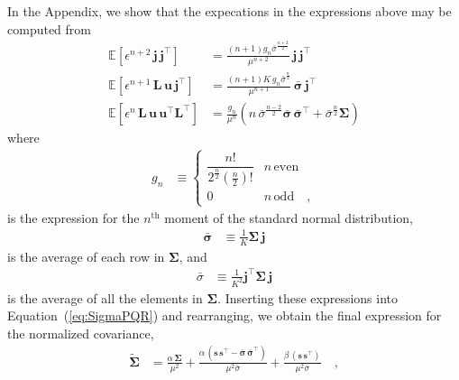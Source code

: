 \documentclass[modern]{aastex62}
\begin{document}
%
In the Appendix, we show that the expecations in the expressions above may be computed from
%
\begin{align}
    \mathbb{E}\left[
        \epsilon^{n + 2} \, \mathbf{j} \, \mathbf{j}^\top
        \right]
     & =
    \frac{(n + 1) g_{n} \bar{\sigma}^\frac{n+2}{2}}{\mu^{n+2}} \, \mathbf{j} \, \mathbf{j}^\top
    \\[0.5em]
    \mathbb{E}\left[
        \epsilon^{n + 1} \, \mathbf{L} \, \mathbf{u} \, \mathbf{j}^\top
        \right]
     & =
    \frac{(n + 1) K \, g_{n} \bar{\sigma}^\frac{n}{2}}{\mu^{n+1}} \, \bar{\pmb{\sigma}} \, \mathbf{j}^\top
    \\[0.5em]
    \mathbb{E}\left[
        \epsilon^n \, \mathbf{L} \, \mathbf{u} \, \mathbf{u}^\top \mathbf{L}^\top
        \right]
     & =
    \frac{g_n}{\mu^n} \left(
    n \,  \bar{\sigma}^\frac{n - 2}{2} \bar{\pmb{\sigma}} \, \bar{\pmb{\sigma}}^\top + \bar{\sigma}^\frac{n}{2} \pmb{\Sigma}
    \right)
\end{align}
%
where
%
\begin{align}
    g_n
     & \equiv
    \begin{cases}
        \dfrac{n!}{2^\frac{n}{2} \left(\frac{n}{2}\right)!} & n \, \mathrm{even}
        \\
        0                                                   & n \, \mathrm{odd}
        \quad,
    \end{cases}
\end{align}
%
is the expression for the $n^\mathrm{th}$ moment of the standard normal distribution,
%
\begin{align}
    \bar{\pmb{\sigma}}
     & \equiv
    \frac{1}{K} \pmb{\Sigma} \, \mathbf{j}
\end{align}
%
is the average of each row in $\pmb{\Sigma}$, and
%
\begin{align}
    \bar{\sigma}
     & \equiv
    \frac{1}{K^2} \mathbf{j}^\top \pmb{\Sigma} \, \mathbf{j}
\end{align}
%
is the average of all the elements in $\pmb{\Sigma}$.
%
Inserting these expressions into Equation~(\ref{eq:SigmaPQR}) and rearranging, we obtain
the final expression for the normalized covariance,
%
\begin{align}
    \label{eq:SigmaTilde}
    \tilde{\pmb{\Sigma}}
     & =
    \frac{\alpha \, \pmb{\Sigma}}{\mu^2}  +
    \frac{\alpha \, \left(\mathbf{s} \, \mathbf{s}^\top - \bar{\pmb{\sigma}} \, \bar{\pmb{\sigma}}^\top\right)}{\mu^2 \bar{\sigma}}  +
    \frac{\beta \, \left(\mathbf{s} \, \mathbf{s}^\top\right)}{\mu^2 \bar{\sigma}}
    \quad,
\end{align}
\end{document}
